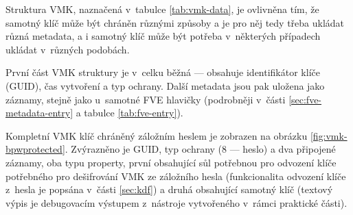 Struktura VMK, naznačená v~tabulce \ref{tab:vmk-data}, je ovlivněna tím, že samotný klíč může být chráněn různými způsoby a je pro něj tedy třeba ukládat různá metadata, a i samotný klíč může být potřeba v~některých případech ukládat v~různých podobách.

První část VMK struktury je v~celku běžná --- obsahuje identifikátor klíče (GUID), čas vytvoření a typ ochrany. Další metadata jsou pak uložena jako záznamy, stejně jako u~samotné FVE hlavičky (podrobněji v~části \ref{sec:fve-metadata-entry} a tabulce \ref{tab:fve-entry}).


Kompletní VMK klíč chráněný záložním heslem je zobrazen na obrázku \ref{fig:vmk-bpwprotected}. Zvý\-raz\-ně\-no je GUID, typ ochrany (8 --- heslo) a dva připojené záznamy, oba typu property, první obsahující sůl potřebnou pro odvození klíče potřebného pro dešifrování VMK ze záložního hesla (funkcionalita odvození klíče z~hesla je popsána v~části \ref{sec:kdf}) a druhá obsahující samotný klíč (textový výpis je debugovacím výstupem z~nástroje vytvořeného v~rámci praktické části).

